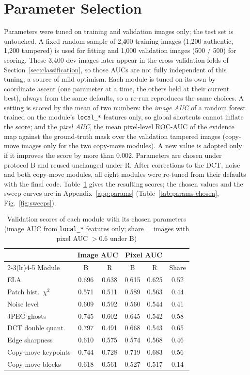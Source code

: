 \section{Parameter Selection}\label{sec:params}

Parameters were tuned on training and validation images only; the test set is untouched. A fixed random sample of
2,400 training images (1,200 authentic, 1,200 tampered) is used for fitting and 1,000 validation images (500 / 500)
for scoring. These 3,400 dev images later appear in the cross-validation folds of
Section~\ref{sec:classification}, so those AUCs are not fully independent of this tuning, a source of mild
optimism. Each module is tuned on its own by coordinate ascent (one parameter at a time, the others held at their
current best), always from the same defaults, so a re-run reproduces the same choices. A setting is scored
by the mean of two numbers: the \emph{image AUC} of a random forest trained on the module's \texttt{local\_*}
features only, so global shortcuts cannot inflate the score; and the \emph{pixel AUC}, the mean pixel-level ROC-AUC
of the evidence map against the ground-truth mask over the validation tampered images (copy-move images only for
the two copy-move modules). A new value is adopted only if it improves the score by more than 0.002. Parameters are
chosen under protocol B and reused unchanged under R. After corrections to the DCT, noise and both copy-move
modules, all eight modules were re-tuned from their defaults with the final code. Table~\ref{tab:params} gives the
resulting scores; the chosen values and the sweep curves are in Appendix~\ref{app:params}
(Table~\ref{tab:params-chosen}, Fig.~\ref{fig:sweeps}).

\begin{table}[t]
\centering
\caption{Validation scores of each module with its chosen parameters (image AUC from \texttt{local\_*} features
only; share = images with pixel AUC $>0.6$ under B)}\label{tab:params}
\footnotesize
\begin{tabular}{@{}lccccc@{}}
\toprule
 & \multicolumn{2}{c}{Image AUC} & \multicolumn{2}{c}{Pixel AUC} & \\
\cmidrule(lr){2-3}\cmidrule(lr){4-5}
Module & B & R & B & R & Share \\
\midrule
ELA & 0.696 & 0.638 & 0.615 & 0.625 & 0.52 \\
Patch hist.\ $\chi^2$ & 0.571 & 0.511 & 0.589 & 0.563 & 0.44 \\
Noise level & 0.609 & 0.592 & 0.560 & 0.544 & 0.41 \\
JPEG ghosts & 0.745 & 0.602 & 0.645 & 0.542 & 0.58 \\
DCT double quant. & 0.797 & 0.491 & 0.668 & 0.543 & 0.65 \\
Edge sharpness & 0.610 & 0.575 & 0.574 & 0.568 & 0.46 \\
Copy-move keypoints & 0.744 & 0.728 & 0.719 & 0.683 & 0.56 \\
Copy-move blocks & 0.618 & 0.561 & 0.527 & 0.517 & 0.14 \\
\bottomrule
\end{tabular}
\end{table}

